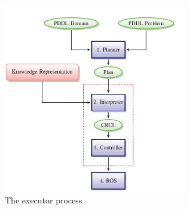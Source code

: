 \begin{figure}[ht!]
\begin{center}
\includegraphics[width=8cm]{images/executordiag.jpg}
\caption{The executor process}
\label{fig:executor}
\end{center}
\end{figure}

